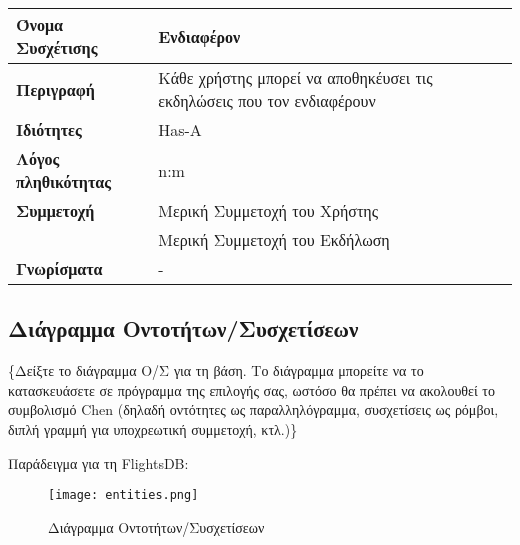 \begin{center}



\begin{tabular}[]{|p{4cm}|p{10cm}|}
  \hline
  \textbf{Όνομα Συσχέτισης} & Ενδιαφέρον \\  \hline
  \textbf{Περιγραφή} & Κάθε χρήστης μπορεί να αποθηκέυσει τις εκδηλώσεις που τον ενδιαφέρουν \\ \hline
  \textbf{Ιδιότητες} & Has-A \\ \hline
  \textbf{Λόγος πληθικότητας} & n:m \\ \hline
  \textbf{Συμμετοχή} & Mερική Συμμετοχή του Χρήστης \\ \cline{2-2}
                     & Μερική Συμμετοχή του Εκδήλωση \\ \hline
  \textbf{Γνωρίσματα} & - \\ \hline
\end{tabular}
\vspace{0.3 cm}

\end{center}


\subsection{Διάγραμμα Οντοτήτων/Συσχετίσεων}

\{Δείξτε το διάγραμμα Ο/Σ για τη βάση. Το διάγραμμα μπορείτε να το
κατασκευάσετε σε πρόγραμμα της επιλογής σας, ωστόσο θα πρέπει να
ακολουθεί το συμβολισμό Chen (δηλαδή οντότητες ως παραλληλόγραμμα,
συσχετίσεις ως ρόμβοι, διπλή γραμμή για υποχρεωτική συμμετοχή, κτλ.)\}

Παράδειγμα για τη FlightsDB:
\begin{figure}[H]
  \centering
  \texttt{[image: entities.png]}
  \caption{Διάγραμμα Οντοτήτων/Συσχετίσεων}
\end{figure}


